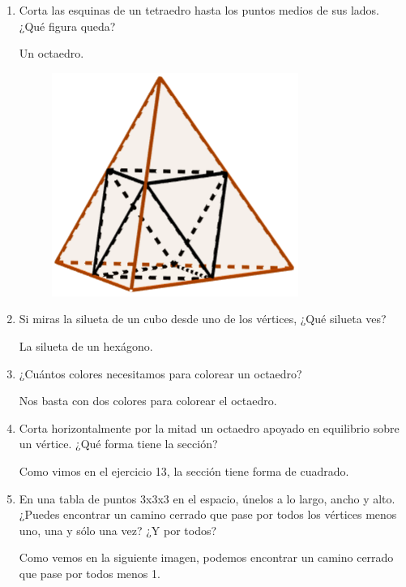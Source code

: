 \begin{enumerate}
	
	\item Corta las esquinas de un tetraedro hasta los puntos medios de sus lados. ¿Qué figura queda?
	
	Un octaedro.
	
	\begin{figure}[H]
		\centering
		\includegraphics[scale=0.3]{images/grafos_poligonos_poliedros/a5.png}
	\end{figure}
	
	\item Si miras la silueta de un cubo desde uno de los vértices, ¿Qué silueta ves?
	
	La silueta de un hexágono.
	
	\item ¿Cuántos colores necesitamos para colorear un octaedro?
	
	Nos basta con dos colores para colorear el octaedro.
	
	\item Corta horizontalmente por la mitad un octaedro apoyado en equilibrio sobre un vértice. ¿Qué forma tiene la sección?
	
	Como vimos en el ejercicio 13, la sección tiene forma de cuadrado.
	
	\item En una tabla de puntos 3x3x3 en el espacio, únelos a lo largo, ancho y alto. ¿Puedes encontrar un camino cerrado que pase por todos los vértices menos uno, una y sólo una vez? ¿Y por todos?
	
	Como vemos en la siguiente imagen, podemos encontrar un camino cerrado que pase por todos menos 1.
	

\end{enumerate}
